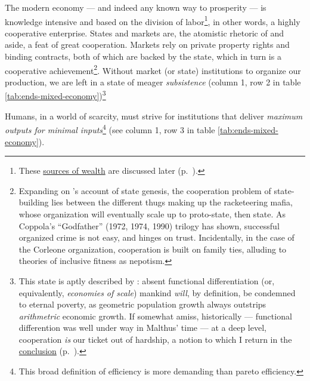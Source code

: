 The modern economy --- and indeed any known way to prosperity --- is knowledge intensive and based on the division of labor\footnote
	{These \hyperref[sec:sources-of-wealth]{sources of wealth} are discussed later (p.~\pageref{sec:sources-of-wealth}).},
in other words, a highly cooperative enterprise. States and markets are, the atomistic rhetoric of \citeauthor{Hobbes-1651-aa} and \citeauthor{Smith-1776-lq} aside, a feat of great cooperation. Markets rely on private property rights and binding contracts, both of which are backed by the state, which in turn is a cooperative achievement\footnote{
	Expanding on \citeauthor{Tilly-1985-aa}'s account of state genesis, the cooperation problem of state-building lies between the different thugs making up the racketeering mafia, whose organization will eventually scale up to proto-state, then state. As Coppola's ``Godfather'' (1972, 1974, 1990) trilogy has shown, successful organized crime is not easy, and hinges on trust. Incidentally, in the case of the Corleone organization, cooperation is built on family ties, alluding to theories of inclusive fitness as nepotism.}.
Without market (or state) institutions to organize our production, we are left in a state of meager \emph{subsistence} (column 1, row 2 in table \ref{tab:ends-mixed-economy})\footnote
	{This state is aptly described by \cite{Malthus1798}: absent functional differentiation (or, equivalently, \emph{economies of scale}) mankind \emph{will}, by definition, be condemned to eternal poverty, as geometric population growth always outstrips \emph{arithmetric} economic growth. If somewhat amiss, historically --- functional differention was well under way in Malthus' time --- at a deep level, cooperation \emph{is} our ticket out of hardship, a notion to which I return in the \hyperref[sec:growthsolidarity]{conclusion} (p.~\pageref{sec:growthsolidarity}).}

Humans, in a world of scarcity, must strive for institutions that deliver \emph{maximum outputs for minimal inputs}\footnote
	{This broad definition of efficiency is more demanding than pareto efficiency.} 
(see column 1, row 3 in table \ref{tab:ends-mixed-economy}).

